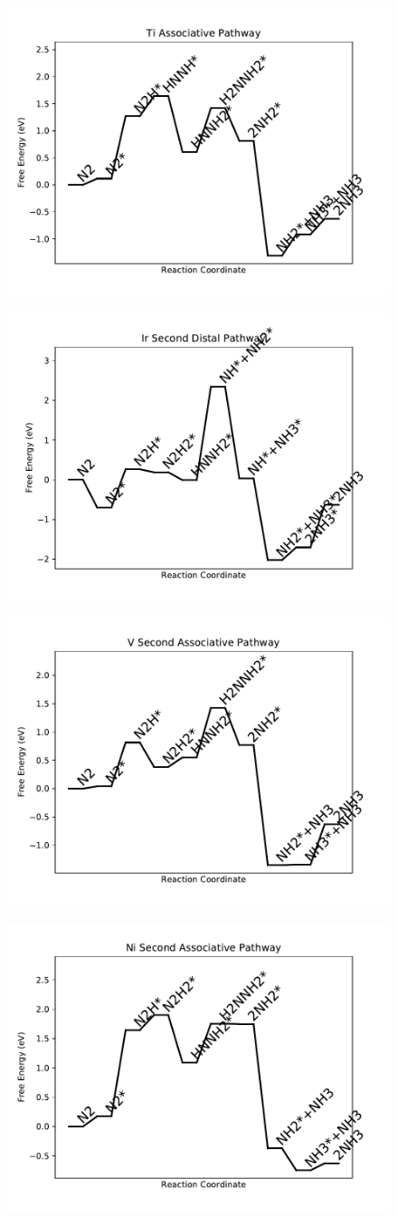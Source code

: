\documentclass[journal=jacsat,manuscript=article]{achemso}
\begin{document}
\newpage
\begin{figure}
\includegraphics[width=0.5\linewidth]{data/plots/Ti_associative.pdf}
\label{fig:Ti_associative}
\end{figure}

\begin{figure}
\includegraphics[width=0.5\linewidth]{data/plots/Ir_distal_2.pdf}
\label{fig:Ir_distal_2}
\end{figure}

\newpage
\begin{figure}
\includegraphics[width=0.5\linewidth]{data/plots/V_associative_2.pdf}
\label{fig:V_associative_2}
\end{figure}

\begin{figure}
\includegraphics[width=0.5\linewidth]{data/plots/Ni_associative_2.pdf}
\label{fig:Ni_associative_2}
\end{figure}
\end{document}

